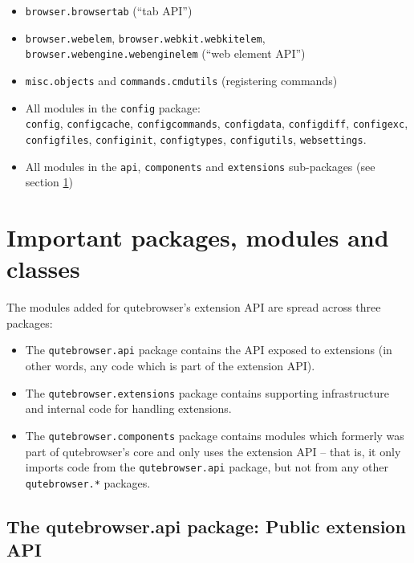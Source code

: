 \begin{itemize}[parsep=5pt]
  \item \texttt{browser.browsertab} (``tab API'')
  \item \texttt{browser.webelem}, \texttt{browser.webkit.webkitelem},
    \texttt{browser.webengine.webenginelem} (``web element API'')
  \item \texttt{misc.objects} and \texttt{commands.cmdutils} (registering commands)
  \item All modules in the \texttt{config} package: \\ \texttt{config}, \texttt{configcache},
    \texttt{configcommands}, \texttt{configdata}, \texttt{configdiff},
    \texttt{configexc}, \\ \texttt{configfiles}, \texttt{configinit}, \texttt{configtypes},
    \texttt{configutils}, \texttt{websettings}.
  \item All modules in the \texttt{api}, \texttt{components}
    and \texttt{extensions} sub-packages (see section \ref{sec:important})
\end{itemize}


\section{Important packages, modules and classes}
\label{sec:important}
The modules added for qutebrowser's extension API are spread across three
packages:

\begin{itemize}
\item The \verb|qutebrowser.api| package contains the API exposed to
  extensions (in other words, any code which is part of the extension API).
\item The \verb|qutebrowser.extensions| package contains supporting infrastructure and
  internal code for handling extensions.
\item The \verb|qutebrowser.components| package contains modules which formerly
was part of qutebrowser's core and only uses the extension API -- that is, it
only imports code from the \verb|qutebrowser.api| package, but not from any
other \verb|qutebrowser.*| packages.
\end{itemize}

\subsection[The qutebrowser.api package]{The qutebrowser.api package: Public extension API}

